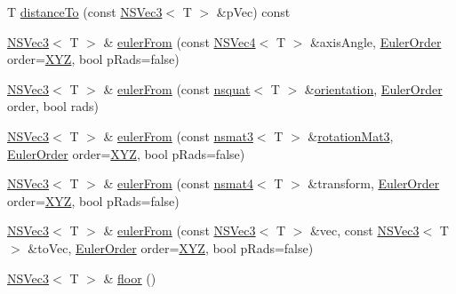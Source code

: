 \begin{DoxyCompactItemize}
\item 
T \hyperlink{structNSVec3_a7b43f0923dca2a47166ea57d250c732c}{distance\-To} (const \hyperlink{structNSVec3}{N\-S\-Vec3}$<$ T $>$ \&p\-Vec) const 
\item 
\hyperlink{structNSVec3}{N\-S\-Vec3}$<$ T $>$ \& \hyperlink{structNSVec3_a7a83b4473a7ec81cd6d8c8221a40f32d}{euler\-From} (const \hyperlink{structNSVec4}{N\-S\-Vec4}$<$ T $>$ \&axis\-Angle, \hyperlink{structNSVec3_a1d9e373d933930ba26c0206912bbd7be}{Euler\-Order} order=\hyperlink{structNSVec3_a1d9e373d933930ba26c0206912bbd7bea7d78982d25e830ab70c31e8125c2363f}{X\-Y\-Z}, bool p\-Rads=false)
\item 
\hyperlink{structNSVec3}{N\-S\-Vec3}$<$ T $>$ \& \hyperlink{structNSVec3_a9c4a90377342729b7074f311c96e8fa0}{euler\-From} (const \hyperlink{structnsquat}{nsquat}$<$ T $>$ \&\hyperlink{nsquat_8h_af20bc5e18c379261a387ab197e9b971f}{orientation}, \hyperlink{structNSVec3_a1d9e373d933930ba26c0206912bbd7be}{Euler\-Order} order, bool rads)
\item 
\hyperlink{structNSVec3}{N\-S\-Vec3}$<$ T $>$ \& \hyperlink{structNSVec3_ac68de2d8c327ca3e8a6778df9e901518}{euler\-From} (const \hyperlink{structnsmat3}{nsmat3}$<$ T $>$ \&\hyperlink{nsmat3_8h_ad4de391de75c02e722b41b139734200b}{rotation\-Mat3}, \hyperlink{structNSVec3_a1d9e373d933930ba26c0206912bbd7be}{Euler\-Order} order=\hyperlink{structNSVec3_a1d9e373d933930ba26c0206912bbd7bea7d78982d25e830ab70c31e8125c2363f}{X\-Y\-Z}, bool p\-Rads=false)
\item 
\hyperlink{structNSVec3}{N\-S\-Vec3}$<$ T $>$ \& \hyperlink{structNSVec3_ad8c1221c4b5f9ac7efe31df9a8497b95}{euler\-From} (const \hyperlink{structnsmat4}{nsmat4}$<$ T $>$ \&transform, \hyperlink{structNSVec3_a1d9e373d933930ba26c0206912bbd7be}{Euler\-Order} order=\hyperlink{structNSVec3_a1d9e373d933930ba26c0206912bbd7bea7d78982d25e830ab70c31e8125c2363f}{X\-Y\-Z}, bool p\-Rads=false)
\item 
\hyperlink{structNSVec3}{N\-S\-Vec3}$<$ T $>$ \& \hyperlink{structNSVec3_a8a5999155b19d814a2e96dd07de16252}{euler\-From} (const \hyperlink{structNSVec3}{N\-S\-Vec3}$<$ T $>$ \&vec, const \hyperlink{structNSVec3}{N\-S\-Vec3}$<$ T $>$ \&to\-Vec, \hyperlink{structNSVec3_a1d9e373d933930ba26c0206912bbd7be}{Euler\-Order} order=\hyperlink{structNSVec3_a1d9e373d933930ba26c0206912bbd7bea7d78982d25e830ab70c31e8125c2363f}{X\-Y\-Z}, bool p\-Rads=false)
\item 
\hyperlink{structNSVec3}{N\-S\-Vec3}$<$ T $>$ \& \hyperlink{structNSVec3_a9335b212992cb6b308ed3a0cb9618a13}{floor} ()
\item 

\end{DoxyCompactItemize}
